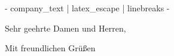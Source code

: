 \documentclass[
    11pt,
    a4paper,
    letter,
    parskip=yes,
    backaddress=off,
    ]{scrlttr2}
\date{ {{- location_date -}} }
\begin{document}
\begin{letter}{ {{- company_text | latex_escape | linebreaks -}} }

\opening{Sehr geehrte Damen und Herren,}

\lipsum[2-3] %

\closing{Mit freundlichen Grüßen}
\end{letter}
\end{document}
